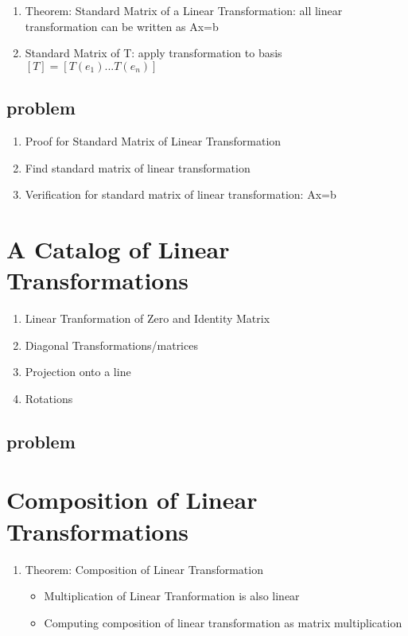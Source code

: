 \documentclass{article}
\begin{document}
\begin{enumerate}
    \item Theorem: Standard Matrix of a Linear Transformation: all linear
	transformation can be written as Ax=b
    \item Standard Matrix of T: apply transformation to basis
	$ [T] = [T(e_1) ... T(e_n)] $
\end{enumerate}

\subsection{problem}
\begin{enumerate}
    \item Proof for Standard Matrix of Linear Transformation
    \item Find standard matrix of linear transformation
    \item Verification for standard matrix of linear transformation: Ax=b
\end{enumerate}

\section{A Catalog of Linear Transformations}

\begin{enumerate}
    \item Linear Tranformation of Zero and Identity Matrix
    \item Diagonal Transformations/matrices
    \item Projection onto a line
    \item Rotations
\end{enumerate}

\subsection{problem}
\begin{enumerate}
\end{enumerate}

\section{Composition of Linear Transformations}

\begin{enumerate}
    \item Theorem: Composition of Linear Transformation
	\begin{itemize}
	    \item Multiplication of Linear Tranformation is also linear
	    \item Computing composition of linear transformation as matrix
		multiplication
	\end{itemize}
\end{enumerate}
\end{document}
